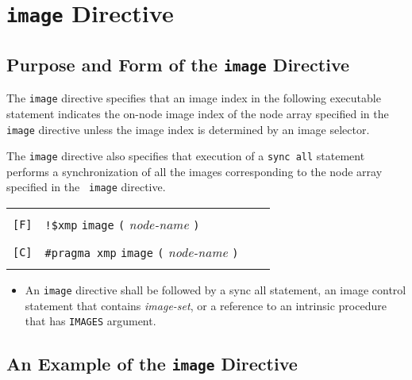 \section{{\tt image} Directive}
\subsection{Purpose and Form of the {\tt image} Directive}

The {\tt image} directive specifies that 
an image index in the following executable statement
indicates the on-node image index
of the node array specified in the {\tt image} directive
unless the image index is determined by an image selector.


The {\tt image} directive also specifies that 
execution of a {\tt sync all} statement performs a synchronization of
all the images corresponding to the node array specified in the {\tt
image} directive.


\medskip


\begin{tabular}{llll}
 & & & \\
\verb![F]! & \verb|!$xmp| {\tt image} {\tt (} {\it node-name} {\tt )}\\
 & & & \\
\verb![C]! & \verb|#pragma xmp| {\tt image} {\tt (} {\it node-name} {\tt )}\\
 & & & 
\end{tabular}


\begin{itemize}
 \item An {\tt image} directive shall be followed by a sync all statement,
       an image control statement that contains {\it image-set}, or a reference to
       an intrinsic procedure that has {\tt IMAGES} argument.
\end{itemize}

\subsection{An Example of the {\tt image} Directive}

